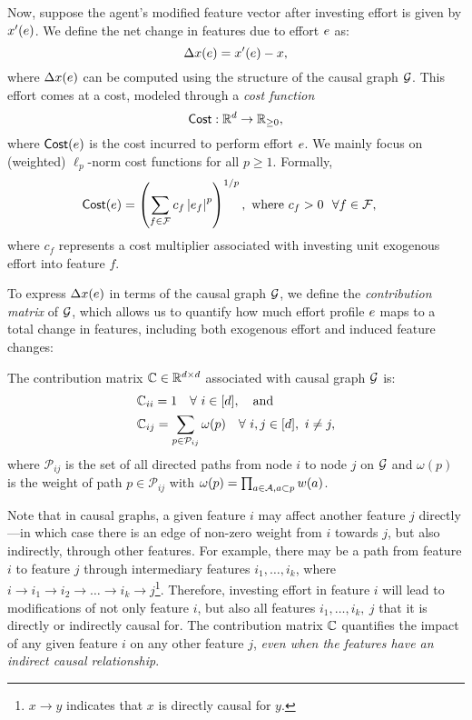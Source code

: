 Now, suppose the agent's modified feature vector after investing effort is given by $x'(e)$. We define the net change in features due to effort $e$ as:
\[
      \Delta x(e) = x'(e) - x,
\]
where $\Delta x(e)$ can be computed using the structure of the causal graph $\mathcal{G}$. This effort comes at a cost, modeled through a \emph{cost function} 
\[
\textsf{Cost}: \mathbb{R}^{d} \to \mathbb{R}_{\geq 0},
\]
where $\textsf{Cost}(e)$ is the cost incurred to perform effort $e$. We mainly focus on (weighted) $\ell_p$-norm cost functions for all $p \geq 1$. Formally, 
\begin{align}\label{eq:cost}
             &\textsf{Cost}(e) = \left(\sum_{f \in \mathcal{F}} c_f\left \vert e_f \right \vert^p \right)^{1/p},~\text{where}~c_f > 0~~\forall f \in \mathcal{F},
\end{align}
where $c_f$ represents a cost multiplier associated with investing unit exogenous effort into feature $f$. 



To express $\Delta x(e)$ in terms of the causal graph $\mathcal{G}$, we define the \emph{contribution matrix} of $\mathcal{G}$, which allows us to quantify how much effort profile $e$ maps to a total change in features, including both exogenous effort and induced feature changes:

\begin{defn}\label{def:cont_matrix}
The contribution matrix $\mathbb{C} \in \mathbb{R}^{d \times d}$ associated with causal graph $\mathcal{G}$ is: 
\begin{align*}
      &\mathbb{C}_{ii} = 1 \quad \forall~i \in [d], \quad \text{and}\\
      &\mathbb{C}_{ij} = \sum_{p \in \mathcal{P}_{ij}} \omega(p) \quad \forall~ i,j \in [d],~i \neq j,
\end{align*}
where $\mathcal{P}_{ij}$ is the set of all directed paths from node $i$ to node $j$ on $\mathcal{G}$ and $\omega(p)$ is the weight of path $p \in \mathcal{P}_{ij}$ with $\omega(p) = \prod_{a \in \mathcal{A}, a \subset p}w(a)$. 
\end{defn}

Note that in causal graphs, a given feature $i$ may affect another feature $j$ directly---in which case there is an edge of non-zero weight from $i$ towards $j$, but also indirectly, through other features. For example, there may be a path from feature $i$ to feature $j$ through intermediary features $i_1,\ldots, i_k$, where $i \to i_1 \to i_2 \to \ldots \to i_k \to j$\footnote{$x \to y $ indicates that $x$ is directly causal for $y$.}. Therefore, investing effort in feature $i$ will lead to modifications of not only feature $i$, but also all features $i_1, \ldots, i_k,~j$ that it is directly or indirectly causal for. The contribution matrix $\mathbb{C}$ quantifies the impact of any given feature $i$ on any other feature $j$, \emph{even when the features have an indirect causal relationship}.

